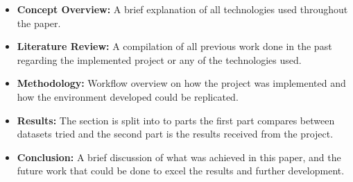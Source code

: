 \begin{itemize}
\item \textbf{Concept Overview:} A brief explanation of all technologies used throughout the paper.
\item \textbf{Literature Review:} A compilation of all previous work done in the past regarding the implemented project or any of the technologies used.
\item \textbf{Methodology:} Workflow overview on how the project was implemented and how the environment developed could be replicated.
\item \textbf{Results:} The section is split into to parts the first part compares between datasets tried and the second part is the results received from the project.
\item \textbf{Conclusion:} A brief discussion of what was achieved in this paper, and the future work that could be done to excel the results and further development.
\end{itemize}

